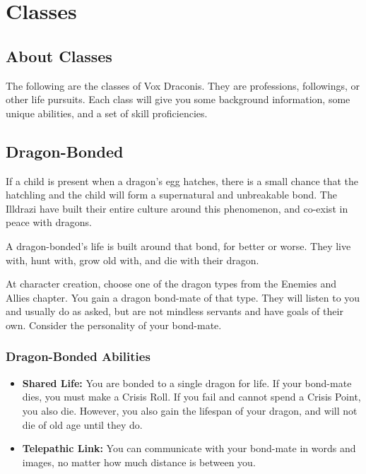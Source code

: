 \chapter{Classes}

\begin{multicols}{2}

\section{About Classes}

The following are the classes of Vox Draconis. They are professions,
followings, or other life pursuits. Each class will give you some
background information, some unique abilities, and a set of skill
proficiencies.

\section{Dragon-Bonded}

If a child is present when a dragon's egg hatches, there is a small
chance that the hatchling and the child will form a supernatural and
unbreakable bond. The Illdrazi have built their entire culture around
this phenomenon, and co-exist in peace with dragons.

A dragon-bonded's life is built around that bond, for better or worse.
They live with, hunt with, grow old with, and die with their dragon.

At character creation, choose one of the dragon types from the
Enemies and Allies chapter. You gain a dragon bond-mate of that
type. They will listen to you and usually do as asked, but are
not mindless servants and have goals of their own. Consider the
personality of your bond-mate.

\subsection{Dragon-Bonded Abilities}

\begin{itemize}
  \item \textbf{Shared Life:} You are bonded to a single dragon for
    life. If your bond-mate dies, you must make a Crisis Roll. If you
    fail and cannot spend a Crisis Point, you also die. However, you
    also gain the lifespan of your dragon, and will not die of old age until
    they do.
  \item \textbf{Telepathic Link:} You can communicate with your bond-mate in
    words and images, no matter how much distance is between you.
\end{itemize}


\end{multicols}
